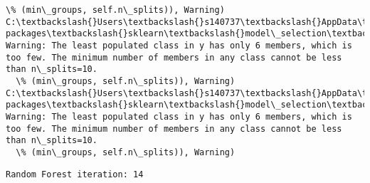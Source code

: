 \documentclass[11pt]{article}
\begin{document}
\begin{Verbatim}[commandchars=\\\{\}]
  \% (min\_groups, self.n\_splits)), Warning)
C:\textbackslash{}Users\textbackslash{}s140737\textbackslash{}AppData\textbackslash{}Local\textbackslash{}Continuum\textbackslash{}anaconda3\textbackslash{}lib\textbackslash{}site-packages\textbackslash{}sklearn\textbackslash{}model\_selection\textbackslash{}\_split.py:605: Warning: The least populated class in y has only 6 members, which is too few. The minimum number of members in any class cannot be less than n\_splits=10.
  \% (min\_groups, self.n\_splits)), Warning)
C:\textbackslash{}Users\textbackslash{}s140737\textbackslash{}AppData\textbackslash{}Local\textbackslash{}Continuum\textbackslash{}anaconda3\textbackslash{}lib\textbackslash{}site-packages\textbackslash{}sklearn\textbackslash{}model\_selection\textbackslash{}\_split.py:605: Warning: The least populated class in y has only 6 members, which is too few. The minimum number of members in any class cannot be less than n\_splits=10.
  \% (min\_groups, self.n\_splits)), Warning)

    \end{Verbatim}

    \begin{Verbatim}[commandchars=\\\{\}]
Random Forest iteration: 14 

    \end{Verbatim}
\end{document}

